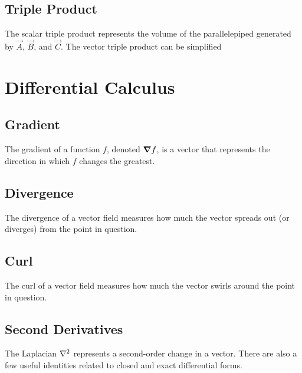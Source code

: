 \subsection{Triple Product}
The scalar triple product represents the volume of the parallelepiped generated by $\vec{A}$, $\vec{B}$, and $\vec{C}$.
The vector triple product can be simplified 

\section{Differential Calculus}
\subsection{Gradient}
The gradient of a function $f$, denoted $\boldsymbol{\mathbf{\nabla}}f$, is a vector that represents the direction in which $f$ changes the greatest.

\subsection{Divergence}
The divergence of a vector field measures how much the vector spreads out (or diverges) from the point in question.

\subsection{Curl}
The curl of a vector field measures how much the vector swirls around the point in question.

\subsection{Second Derivatives}
The Laplacian $\nabla^2$ represents a second-order change in a vector. There are also a few useful identities related to closed and exact differential forms.

